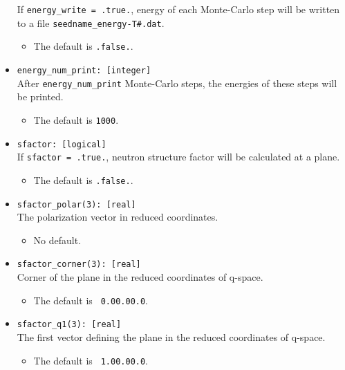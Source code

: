 \documentclass[10pt]{report}
\begin{document}
\begin{itemize}
If {\tt energy\_write = .true.}, energy of each Monte-Carlo step
will be written to a file {\tt seedname\_energy-T\#.dat}.
\begin{itemize} [label=\adfhalfrightarrowhead]
\item The default is {\tt .false.}.
\end{itemize}
\item {\tt energy\_num\_print: [integer]}              \\
After {\tt energy\_num\_print} Monte-Carlo steps, the energies of these steps will be printed. 
\begin{itemize} [label=\adfhalfrightarrowhead]
\item The default is {\tt 1000}.
\end{itemize}
\item {\tt sfactor: [logical]}                             \\
If {\tt sfactor = .true.}, neutron structure factor will be calculated at a plane.
\begin{itemize} [label=\adfhalfrightarrowhead]
\item The default is {\tt .false.}.
\end{itemize}
\item {\tt sfactor\_polar(3): [real]}                    \\
The polarization vector in reduced coordinates.
\begin{itemize} [label=\adfhalfrightarrowhead]
\item No default.
\end{itemize}
\item {\tt sfactor\_corner(3): [real]}                   \\
Corner of the plane in the reduced coordinates of q-space.
\begin{itemize} [label=\adfhalfrightarrowhead]
\item  The default is {\tt\hspace{0.5cm} 0.0\hspace{1cm}0.0\hspace{1cm}0.0}.
\end{itemize}
\item {\tt sfactor\_q1(3): [real]}                       \\
The first vector defining the plane in the reduced coordinates of q-space.
\begin{itemize} [label=\adfhalfrightarrowhead]
\item  The default is {\tt\hspace{0.5cm} 1.0\hspace{1cm}0.0\hspace{1cm}0.0}.

\end{itemize}
\end{itemize}
\end{document}
